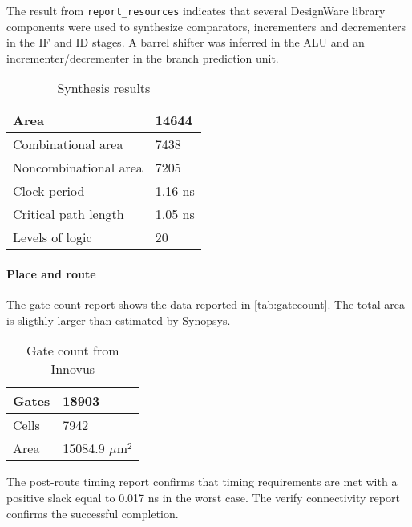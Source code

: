 The result from \texttt{report\_resources} indicates that several DesignWare library components were used to synthesize comparators, incrementers and decrementers in the IF and ID stages. A barrel shifter was inferred in the ALU and an incrementer/decrementer in the branch prediction unit.

\begin{table}[h]
	\centering
	\begin{tabular}{|l|l|}
		\hline
		Area & 14644 \\\hline
		Combinational area & 7438 \\\hline
		Noncombinational area &7205\\\hline
		Clock period & 1.16 ns \\\hline
		Critical path length & 1.05 ns\\\hline
		Levels of logic & 20 \\\hline

	\end{tabular}
\caption{Synthesis results}
\label{tab:synres}
\end{table}

\paragraph{Place and route} The gate count report shows the data reported in \autoref{tab:gatecount}. The total area is sligthly larger than estimated by Synopsys.
\begin{table}[h]
	\centering
	\begin{tabular}{|l|l|}\hline
  Gates &     18903\\\hline Cells &   7942\\\hline Area &   15084.9 $\mu\textrm{m}^2$\\\hline
	\end{tabular}
	\caption{Gate count from Innovus}
	\label{tab:gatecount}
\end{table}

The post-route timing report confirms that timing requirements are met with a positive slack equal to 0.017 ns in the worst case. The verify connectivity report confirms the successful completion.

